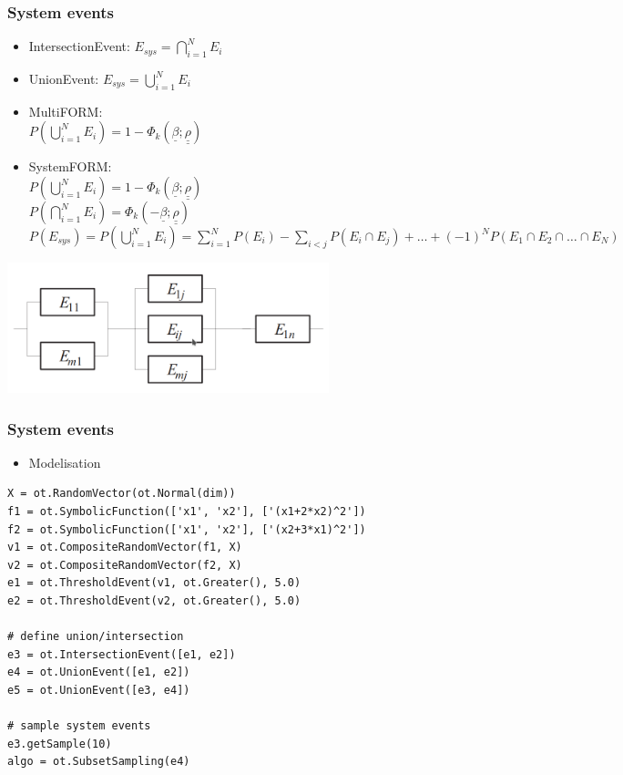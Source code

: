 \documentclass{beamer}
\begin{document}
\begin{frame}
\frametitle{System events}


\begin{itemize}
\item IntersectionEvent: $E_{sys} = \bigcap_{i=1}^N E_i$
\item UnionEvent: $E_{sys} = \bigcup_{i=1}^N E_i$
\item MultiFORM:\\
  $P(\bigcup_{i=1}^N E_i) = 1 - \Phi_k (\underline{\beta}; \underline{\underline{\rho}})$
\item SystemFORM:\\
  $P(\bigcup_{i=1}^N E_i) = 1 - \Phi_k (\underline{\beta}; \underline{\underline{\rho}})$\\
  $P(\bigcap_{i=1}^N E_i) = \Phi_k (-\underline{\beta}; \underline{\underline{\rho}})$\\
  $P(E_{sys}) = P(\bigcup_{i=1}^N E_i) = \sum_{i=1}^N P(E_i) - \sum_{i < j} P(E_i \cap E_j) + \dots + (-1)^N P(E_1 \cap E_2 \cap \dots \cap E_N)$
\end{itemize}

% 
	\begin{center}
\includegraphics[width=0.7\textwidth]{figures/system.png}
\end{center}
\end{frame}


\begin{frame}[containsverbatim]
\frametitle{System events}

\lstset{language=python}

\begin{itemize}
\item Modelisation
\end{itemize}
\begin{lstlisting}
X = ot.RandomVector(ot.Normal(dim))
f1 = ot.SymbolicFunction(['x1', 'x2'], ['(x1+2*x2)^2'])
f2 = ot.SymbolicFunction(['x1', 'x2'], ['(x2+3*x1)^2'])
v1 = ot.CompositeRandomVector(f1, X)
v2 = ot.CompositeRandomVector(f2, X)
e1 = ot.ThresholdEvent(v1, ot.Greater(), 5.0)
e2 = ot.ThresholdEvent(v2, ot.Greater(), 5.0)

# define union/intersection
e3 = ot.IntersectionEvent([e1, e2])
e4 = ot.UnionEvent([e1, e2])
e5 = ot.UnionEvent([e3, e4])

# sample system events
e3.getSample(10)
algo = ot.SubsetSampling(e4)
\end{lstlisting}

\end{frame}
\end{document}

